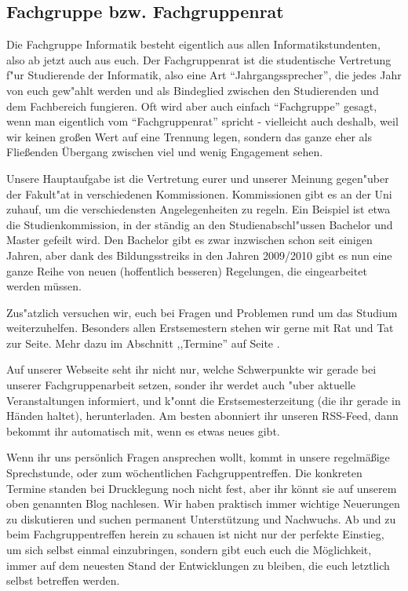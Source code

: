 \subsection{Fachgruppe bzw. Fachgruppenrat}
\label{fachgruppe}

Die Fachgruppe Informatik besteht eigentlich aus allen 
Informatikstundenten, also ab jetzt auch aus euch. Der Fachgruppenrat 
ist die studentische Vertretung f"ur Studierende der Informatik, also 
eine Art "`Jahrgangssprecher"', die jedes Jahr von euch gew"ahlt werden 
und als Bindeglied zwischen den Studierenden und dem Fachbereich 
fungieren. Oft wird aber auch einfach "`Fachgruppe"' gesagt, wenn man 
eigentlich vom "`Fachgruppenrat"' spricht - vielleicht auch deshalb, 
weil wir keinen großen Wert auf eine Trennung legen, sondern das ganze
eher als Fließenden Übergang zwischen viel und wenig Engagement sehen.

Unsere Hauptaufgabe ist die Vertretung eurer und unserer Meinung 
gegen"uber der Fakult"at in verschiedenen Kommissionen. Kommissionen 
gibt es an der Uni zuhauf, um die verschiedensten Angelegenheiten zu 
regeln. Ein Beispiel ist etwa die Studienkommission, in der ständig 
an den Studienabschl"ussen Bachelor und Master gefeilt wird. Den Bachelor 
gibt es zwar inzwischen schon seit einigen Jahren, aber dank des 
Bildungsstreiks in den Jahren 2009/2010 gibt es nun eine ganze Reihe %
von neuen (hoffentlich besseren) Regelungen, die eingearbeitet werden 
müssen.

Zus"atzlich versuchen wir, euch bei Fragen und Problemen rund um das 
Studium weiterzuhelfen. Besonders allen Erstsemestern stehen wir 
gerne mit Rat und Tat zur Seite.  Mehr dazu im Abschnitt ,,Termine'' auf
Seite \pageref{termine}.

Auf unserer Webseite \mbox{} seht ihr nicht 
nur, welche Schwerpunkte wir gerade bei unserer Fachgruppenarbeit setzen, 
sonder ihr werdet auch "uber aktuelle Veranstaltungen informiert, und k"onnt 
die Erstsemesterzeitung (die ihr gerade in Händen haltet), herunterladen. 
Am besten abonniert ihr unseren RSS-Feed, dann bekommt ihr automatisch 
mit, wenn es etwas neues gibt.

Wenn ihr uns persönlich Fragen ansprechen wollt, kommt 
in unsere regelmäßige Sprechstunde, oder zum wöchentlichen Fachgruppentreffen.
Die konkreten Termine standen bei Drucklegung noch nicht fest, aber ihr könnt
sie auf unserem oben genannten Blog nachlesen. Wir haben praktisch immer wichtige 
Neuerungen zu diskutieren und suchen permanent Unterstützung und 
Nachwuchs. Ab und zu beim Fachgruppentreffen herein zu schauen ist 
nicht nur der perfekte Einstieg, um sich selbst einmal einzubringen, 
sondern gibt euch euch die Möglichkeit, immer auf dem neuesten Stand 
der Entwicklungen zu bleiben, die euch letztlich selbst betreffen werden.


